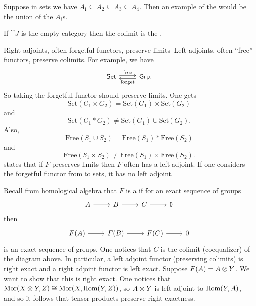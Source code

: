 \documentclass[11pt, twoside]{article}
\begin{document}
Suppose in sets we have $A_1 \subseteq A_2 \subseteq A_3 \subseteq A_4$. Then an example of the \href{https://en.wikipedia.org/wiki/Direct_limit}{} would be the union of the $A_i$s. 

If $\cat J$ is the empty category then the colimit is the \href{https://en.wikipedia.org/wiki/Initial_and_terminal_objects}{}.

Right adjoints, often forgetful functors, preserve limits. Left adjoints, often ``free'' functors, preserve colimits. For example, we have
\[
\begin{tikzcd}
\catn{Set} \arrow[r, shift left, "\mathrm{free}"]& \catn{Grp}. \arrow[l, shift left, "\mathrm{forget}"]
\end{tikzcd}
\]
So taking the forgetful functor should preserve limits. One gets
$$
\mathrm{Set}(G_1\times G_2) = \mathrm{Set}(G_1) \times \mathrm{Set}(G_2)
$$
and
$$
\mathrm{Set}(G_1* G_2) \neq \mathrm{Set}(G_1) \cup \mathrm{Set}(G_2).
$$
Also,
$$
\mathrm{Free}(S_1 \cup S_2) = \mathrm{Free}(S_1)*\mathrm{Free}(S_2)
$$
and
$$
\mathrm{Free}(S_1\times S_2) \neq \mathrm{Free}(S_1) \times \mathrm{Free}(S_2).
$$
\href{https://en.wikipedia.org/wiki/Formal_criteria_for_adjoint_functors}{} states that if $F$ preserves limits then $F$ often has a left adjoint. If one considers the forgetful functor from \href{https://en.wikipedia.org/wiki/Complete_Boolean_algebra}{} to sets, it has no left adjoint.

Recall from homological algebra that $F$ is a \href{https://en.wikipedia.org/wiki/Exact_functor}{} if for an exact sequence of groups
$$
\begin{tikzcd}
A \arrow[r] & B\arrow[r]& C\arrow[r] & 0
\end{tikzcd}
$$
then
$$
\begin{tikzcd}
F(A) \arrow[r] & F(B)\arrow[r]& F(C)\arrow[r] & 0
\end{tikzcd}
$$
is an exact sequence of groups. One notices that $C$ is the colimit (coequalizer) of the diagram above. In particular, a left adjoint functor (preserving colimits) is right exact and a right adjoint functor is left exact. Suppose $F(A) = A \otimes Y$. We want to show that this is right exact. One notices that $\operatorname{Mor}(X\otimes Y, Z) \cong \operatorname{Mor}(X, \operatorname{Hom}(Y, Z))$, so $A\otimes Y$ is left adjoint to $\operatorname{Hom} (Y,A)$, and so it follows that tensor products preserve right exactness. 
\end{document}

